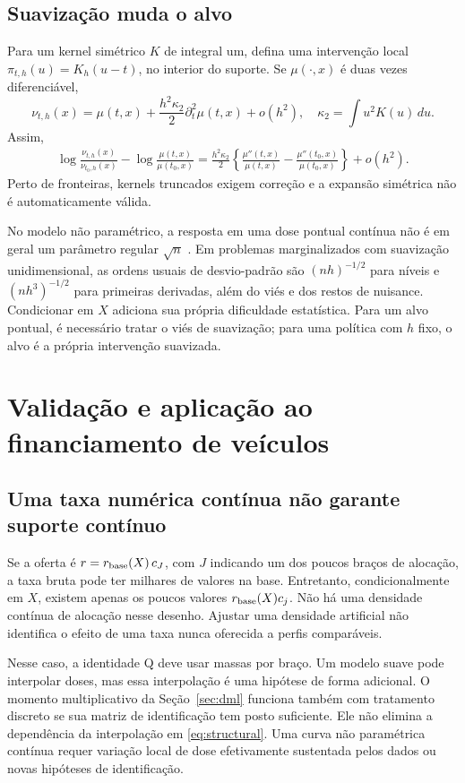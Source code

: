 \documentclass[11pt,a4paper]{article}
\begin{document}
\subsection{Suavização muda o alvo}
Para um kernel simétrico $K$ de integral um, defina uma intervenção local $\pi_{t,h}(u)=K_h(u-t)$, no interior do suporte. Se $\mu(\cdot,x)$ é duas vezes diferenciável,
\begin{equation}
\nu_{t,h}(x)=\mu(t,x)+\frac{h^2\kappa_2}{2}\partial_t^2\mu(t,x)+o(h^2),
\quad\kappa_2=\int u^2K(u)\,du.
\label{eq:biaslocal}
\end{equation}
Assim,
\begin{align}
\log\frac{\nu_{t,h}(x)}{\nu_{t_0,h}(x)}
-\log\frac{\mu(t,x)}{\mu(t_0,x)}
=\frac{h^2\kappa_2}{2}
\left\{\frac{\mu''(t,x)}{\mu(t,x)}-
\frac{\mu''(t_0,x)}{\mu(t_0,x)}\right\}+o(h^2).
\label{eq:logkernelbias}
\end{align}
Perto de fronteiras, kernels truncados exigem correção e a expansão simétrica não é automaticamente válida.

No modelo não paramétrico, a resposta em uma dose pontual contínua não é em geral um parâmetro regular $\sqrt n$ \cite{kennedy2017}. Em problemas marginalizados com suavização unidimensional, as ordens usuais de desvio-padrão são $(nh)^{-1/2}$ para níveis e $(nh^3)^{-1/2}$ para primeiras derivadas, além do viés e dos restos de nuisance. Condicionar em $X$ adiciona sua própria dificuldade estatística. Para um alvo pontual, é necessário tratar o viés de suavização; para uma política com $h$ fixo, o alvo é a própria intervenção suavizada.

\section{Validação e aplicação ao financiamento de veículos}
\label{sec:application}
\subsection{Uma taxa numérica contínua não garante suporte contínuo}
Se a oferta é $r=r_{\rm base}(X)\,c_J$, com $J$ indicando um dos poucos braços de alocação, a taxa bruta pode ter milhares de valores na base. Entretanto, condicionalmente em $X$, existem apenas os poucos valores $r_{\rm base}(X)c_j$. Não há uma densidade contínua de alocação nesse desenho. Ajustar uma densidade artificial não identifica o efeito de uma taxa nunca oferecida a perfis comparáveis.

Nesse caso, a identidade Q deve usar massas por braço. Um modelo suave pode interpolar doses, mas essa interpolação é uma hipótese de forma adicional. O momento multiplicativo da Seção~\ref{sec:dml} funciona também com tratamento discreto se sua matriz de identificação tem posto suficiente. Ele não elimina a dependência da interpolação em \eqref{eq:structural}. Uma curva não paramétrica contínua requer variação local de dose efetivamente sustentada pelos dados ou novas hipóteses de identificação.
\end{document}
